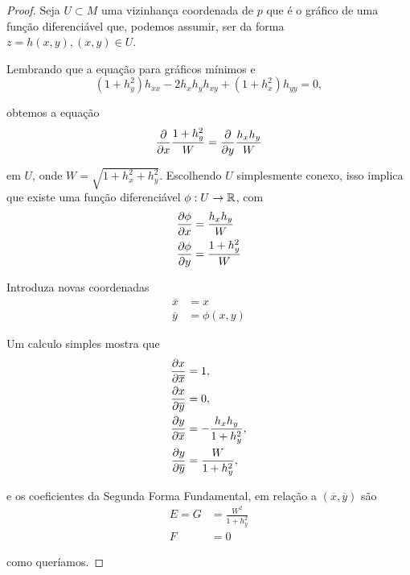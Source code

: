 \begin{proof}
	Seja $U \subset M$ uma vizinhança coordenada de $p$ que é o gráfico de uma função diferenciável que, podemos assumir, ser da forma $z = h(x,y), (x,y) \in U$.
	
	Lembrando que a equação para gráficos mínimos e
	\begin{equation*}
		(1 + h_y^2) h_{xx} - 2 h_x h_y h_{xy} + (1 + h_x^2) h_{yy} = 0,
	\end{equation*}
	
	obtemos a equação
	\begin{equation*}
		\frac{\partial}{\partial x} \frac{1 + h_y^2}{W} = \frac{\partial}{\partial y} \frac{h_x h_y}{W}
	\end{equation*}
	
	em $U$, onde $W = \sqrt{1 + h_x^2 + h_y^2}$. Escolhendo $U$ simplesmente conexo, isso implica que existe uma função diferenciável $\phi: U \rightarrow \mathbb{R}$, com
	\begin{align*}
		\frac{\partial \phi}{\partial x} &= \frac{h_x h_y}{W} \\
		\frac{\partial \phi}{\partial y} &= \frac{1 + h_y^2}{W}
	\end{align*}
	
	Introduza novas coordenadas
	\begin{align*}
		\overline{x} &= x \\
		\overline{y} &= \phi(x,y)
	\end{align*}
	
	Um calculo simples mostra que
	\begin{align*}
		\frac{\partial x}{\partial \overline{x}} &= 1, \\
		\frac{\partial x}{\partial \overline{y}} &= 0, \\
		\frac{\partial y}{\partial \overline{x}} &= -\frac{h_x h_y}{1 + h_y^2}, \\
		\frac{\partial y}{\partial \overline{y}} &= \frac{W}{1 + h_y^2},
	\end{align*}
	
	e os coeficientes da Segunda Forma Fundamental, em relação a $(\overline{x}, \overline{y})$ são
	\begin{align*}
		E = G &= \frac{W^2}{1 + h_y^2} \\
		F &= 0
	\end{align*}
	
	como queríamos.
\end{proof}